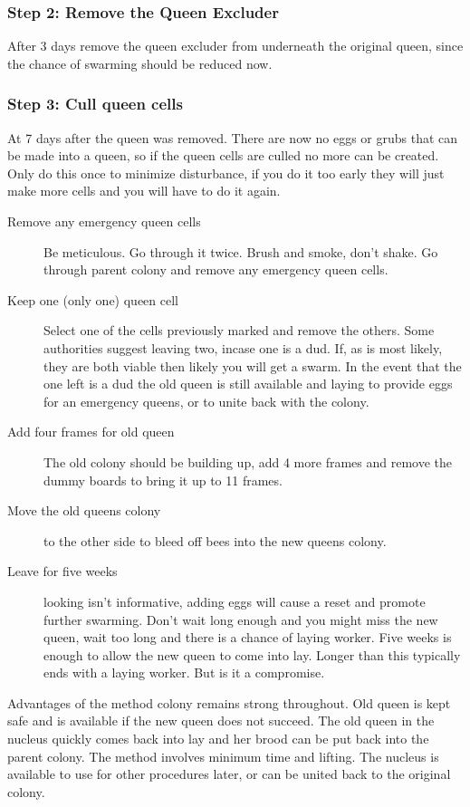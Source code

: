 \subsubsection*{Step 2: Remove the Queen Excluder}

After 3 days remove the queen excluder from underneath the original queen,
since the chance of swarming should be reduced now.

\subsubsection*{Step 3: Cull queen cells}

At 7 days after the queen was removed.
There are now no eggs or grubs that can be made into a queen, 
so if the queen cells are culled no more can be created.
Only do this once to minimize disturbance,
if you do it too early they will just make more cells and you will have to do it again.

\begin{description}
  \item[Remove any emergency queen cells] Be meticulous.  Go through it twice.  Brush and smoke, don't shake.
  Go through parent colony and remove any emergency queen cells.
  \item[Keep one (only one) queen cell]
  Select one of the cells previously marked and remove the others.
  Some authorities suggest leaving two, incase one is a dud.
  If, as is most likely, they are both viable then likely you will get a swarm.
  In the event that the one left is a dud the old queen is still available and laying to provide eggs for an emergency queens,
  or to unite back with the colony.
  \item[Add four frames for old queen] The old colony should be building up, add 4 more frames and remove the dummy boards to bring it up to 11 frames.
  \item[Move the old queens colony] to the other side to bleed off bees into the new queens colony.
  \item[Leave for five weeks] looking isn't informative, adding eggs will cause a reset and promote further swarming.
  Don't wait long enough and you might miss the new queen, wait too long and there is a chance of laying worker.
  Five weeks is enough to allow the new queen to come into lay.  Longer than this typically ends with a laying worker.
  But is it a compromise.
\end{description}

Advantages of the method
colony remains strong throughout.
Old queen is kept safe and is available if the new queen does not succeed.
The old queen in the nucleus quickly comes back into lay and her brood can be put back into the parent colony.
The method involves minimum time and lifting.
The nucleus is available to use for other procedures later, or can be united back to the original colony.

